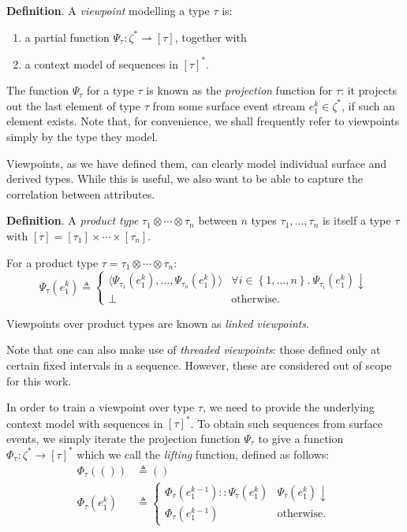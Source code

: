 \documentclass[12pt,a4paper,twoside,openright]{report}
\newcommand{\set}[1]{ \left\{ #1 \right\} }
\begin{document}
\textbf{Definition}. A \emph{viewpoint} modelling a type $\tau$ is:
\begin{enumerate}[label=\arabic*., itemsep=0mm]
  \item a partial function $\Psi_\tau : \zeta^* \rightharpoonup [\tau]$,
    together with
  \item a context model of sequences in $[\tau]^*$.
\end{enumerate}

The function $\Psi_\tau$ for a type $\tau$ is known as the \emph{projection}
function for $\tau$: it projects out the last element of type $\tau$ from some
surface event stream $e_1^k \in \zeta^*$, if such an element exists. Note that,
for convenience, we shall frequently refer to viewpoints simply by the type they
model. 

Viewpoints, as we have defined them, can clearly model individual surface and
derived types. While this is useful, we also want to be able to capture the
correlation between attributes.

\textbf{Definition}. A \emph{product type} $\tau_1 \otimes \cdots \otimes
\tau_n$ between $n$ types $\tau_1, \ldots, \tau_n$ is itself a type $\tau$ with
$[\tau] = [\tau_1] \times \cdots \times [\tau_n]$. 

For a product type $\tau = \tau_1 \otimes \cdots \otimes \tau_n$:
$$ \Psi_\tau(e_1^k) \triangleq
\begin{cases}
  \langle\Psi_{\tau_1}(e_1^k), \ldots, \Psi_{\tau_n}(e_1^k)\rangle & \forall i
  \in \set{1,\ldots,n}.\
  \Psi_{\tau_i}(e_1^k)\downarrow \\
  \bot & \text{otherwise.}
\end{cases}
$$

Viewpoints over product types are known as \emph{linked viewpoints}. 

Note that one can also make use of \emph{threaded viewpoints}: those defined
only at certain fixed intervals in a sequence. However, these are considered out
of scope for this work.

In order to train a viewpoint over type $\tau$, we need to provide the
underlying context model with sequences in $[\tau]^*$. To obtain such sequences
from surface events, we simply iterate the projection function $\Psi_\tau$ to
give a function $\Phi_\tau : \zeta^* \rightarrow [\tau]^*$ which we call the
\emph{lifting} function, defined as follows:
\begin{align*}
  \Phi_\tau(()) &\triangleq () \\
  \Phi_\tau(e_1^k) &\triangleq \begin{cases}
    \Phi_\tau(e_1^{k-1})::\Psi_\tau(e_1^k) & \Psi_\tau(e_1^k)\downarrow \\
    \Phi_\tau(e_1^{k-1}) & \text{otherwise.}
  \end{cases}
\end{align*}
\end{document}
